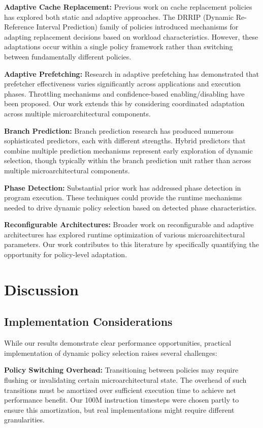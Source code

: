 \documentclass[conference]{IEEEtran}
\begin{document}
\textbf{Adaptive Cache Replacement:}
Previous work on cache replacement policies has explored both static and adaptive approaches. The DRRIP (Dynamic Re-Reference Interval Prediction) family of policies introduced mechanisms for adapting replacement decisions based on workload characteristics. However, these adaptations occur within a single policy framework rather than switching between fundamentally different policies.

\textbf{Adaptive Prefetching:}
Research in adaptive prefetching has demonstrated that prefetcher effectiveness varies significantly across applications and execution phases. Throttling mechanisms and confidence-based enabling/disabling have been proposed. Our work extends this by considering coordinated adaptation across multiple microarchitectural components.

\textbf{Branch Prediction:}
Branch prediction research has produced numerous sophisticated predictors, each with different strengths. Hybrid predictors that combine multiple prediction mechanisms represent early exploration of dynamic selection, though typically within the branch prediction unit rather than across multiple microarchitectural components.

\textbf{Phase Detection:}
Substantial prior work has addressed phase detection in program execution. These techniques could provide the runtime mechanisms needed to drive dynamic policy selection based on detected phase characteristics.

\textbf{Reconfigurable Architectures:}
Broader work on reconfigurable and adaptive architectures has explored runtime optimization of various microarchitectural parameters. Our work contributes to this literature by specifically quantifying the opportunity for policy-level adaptation.

\section{Discussion}

\subsection{Implementation Considerations}

While our results demonstrate clear performance opportunities, practical implementation of dynamic policy selection raises several challenges:

\textbf{Policy Switching Overhead:} Transitioning between policies may require flushing or invalidating certain microarchitectural state. The overhead of such transitions must be amortized over sufficient execution time to achieve net performance benefit. Our 100M instruction timesteps were chosen partly to ensure this amortization, but real implementations might require different granularities.
\end{document}
